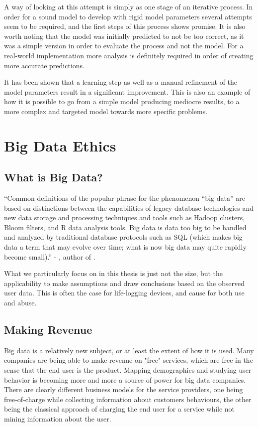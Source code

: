 A way of looking at this attempt is simply as one stage of an iterative
process. In order for a sound model to develop with rigid model 
parameters several attempts seem to be required, and the first steps
of this process shows promise. It is also worth noting that the model
was initially predicted to not be too correct, as it was a simple 
version in order to evaluate the process and not the model. For a 
real-world implementation more analysis is definitely required in order
of creating more accurate predictions.

It has been shown that a learning step as well as a manual refinement of 
the model parameters result in a significant improvement. This is also
an example of how it is possible to go from a simple model producing 
mediocre results, to a more complex and targeted model towards more
specific problems.

\section{Big Data Ethics}

\subsection{What is Big Data?}

\begin{displayquote}
    ``Common definitions of the popular phrase for the phenomenon 
    “big data” are based on distinctions between the capabilities 
    of legacy database technologies and new data storage and 
    processing techniques and tools such as Hadoop clusters, 
    Bloom filters, and R data analysis tools. Big data is data too 
    big to be handled and analyzed by traditional database protocols
    such as SQL (which makes big data a term that  may evolve over 
    time; what is now big data may quite rapidly become small).''
    - \citeauthor{ethics-of-big-data}, author of 
     \cite{ethics-of-big-data}.
\end{displayquote}

What we particularly focus on in this thesis is just not the size,
but the applicability to make assumptions and draw conclusions based
on the observed user data. This is often the case for life-logging
devices, and cause for both use and abuse.

\subsection{Making Revenue}
Big data is a relatively new subject, or at least the extent of how it is used. 
Many companies are being able to make revenue on "free" services, which are free 
in the sense that the end user is the product. Mapping demographics and studying 
user behavior is becoming more and more a source of power for big data companies.
There are clearly different business models for the service providers, one being 
free-of-charge while collecting information about customers behaviours, the other 
being the classical approach of charging the end user for a service while not 
mining information about the user.

